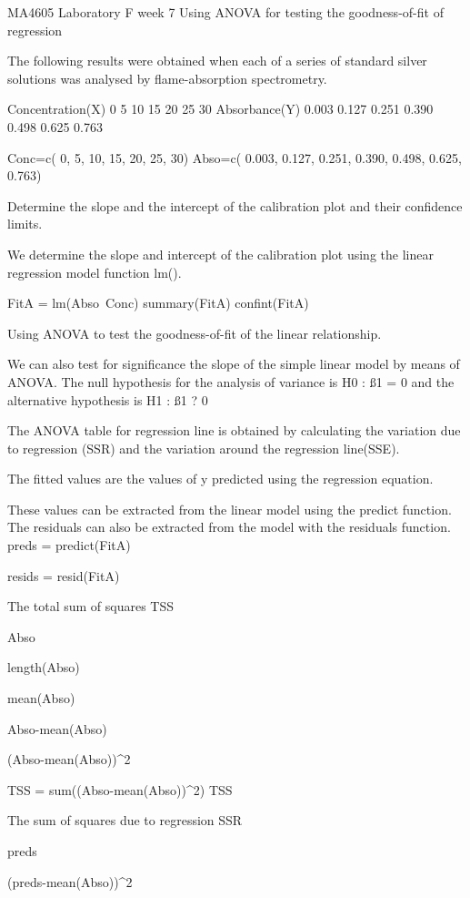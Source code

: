 MA4605 Laboratory F week 7
Using ANOVA for testing the goodness-of-fit of regression

The following results were obtained when each of a series of standard silver solutions was analysed by flame-absorption spectrometry.

Concentration(X)
0
5
10
15
20
25
30
Absorbance(Y)
0.003
0.127
0.251
0.390
0.498
0.625
0.763

Conc=c( 0, 5, 10, 15, 20, 25, 30)
Abso=c( 0.003, 0.127, 0.251, 0.390, 0.498, 0.625, 0.763)


Determine the slope and the intercept of the calibration plot and their confidence limits.

We determine the slope and intercept of the calibration plot using the linear regression model function lm().


FitA = lm(Abso~Conc)
summary(FitA)
confint(FitA)


Using ANOVA to test the goodness-of-fit of the linear relationship.

We can also test for significance the slope of the simple linear model by means of ANOVA. The null hypothesis for the analysis of variance is H0 : ß1 = 0 and the alternative hypothesis is H1 : ß1 ? 0

The ANOVA table for regression line is obtained by calculating the variation due to regression (SSR) and the variation around the regression line(SSE).



The fitted  values are the values of y predicted using the regression equation.

These values can be extracted from the linear model using the predict function.
The residuals can also be extracted from the model with the residuals function.
preds = predict(FitA)

resids =  resid(FitA)



The total sum of squares TSS


Abso

length(Abso)

mean(Abso)

Abso-mean(Abso)

(Abso-mean(Abso))^2

TSS = sum((Abso-mean(Abso))^2)
TSS



The sum of squares due to regression SSR


preds

(preds-mean(Abso))^2

